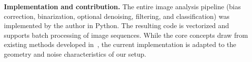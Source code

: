 \textbf{Implementation and contribution.}  
The entire image analysis pipeline (bias correction, binarization, optional denoising, filtering, and classification) was implemented by the author in Python. The resulting code is vectorized and supports batch processing of image sequences. While the core concepts draw from existing methods developed in~\cite{bergschneider_spin-resolved_2018}, the current implementation is adapted to the geometry and noise characteristics of our setup. 
